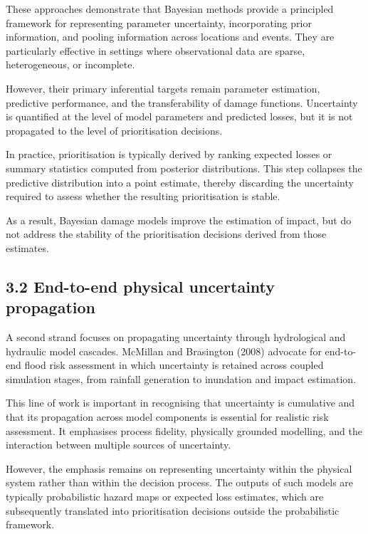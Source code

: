\documentclass[
]{article}
\begin{document}
These approaches demonstrate that Bayesian methods provide a principled
framework for representing parameter uncertainty, incorporating prior
information, and pooling information across locations and events. They
are particularly effective in settings where observational data are
sparse, heterogeneous, or incomplete.

However, their primary inferential targets remain parameter estimation,
predictive performance, and the transferability of damage functions.
Uncertainty is quantified at the level of model parameters and predicted
losses, but it is not propagated to the level of prioritisation
decisions.

In practice, prioritisation is typically derived by ranking expected
losses or summary statistics computed from posterior distributions. This
step collapses the predictive distribution into a point estimate,
thereby discarding the uncertainty required to assess whether the
resulting prioritisation is stable.

As a result, Bayesian damage models improve the estimation of impact,
but do not address the stability of the prioritisation decisions derived
from those estimates.

\subsection{3.2 End-to-end physical uncertainty
propagation}\label{end-to-end-physical-uncertainty-propagation}

A second strand focuses on propagating uncertainty through hydrological
and hydraulic model cascades. McMillan and Brasington (2008) advocate
for end-to-end flood risk assessment in which uncertainty is retained
across coupled simulation stages, from rainfall generation to inundation
and impact estimation.

This line of work is important in recognising that uncertainty is
cumulative and that its propagation across model components is essential
for realistic risk assessment. It emphasises process fidelity,
physically grounded modelling, and the interaction between multiple
sources of uncertainty.

However, the emphasis remains on representing uncertainty within the
physical system rather than within the decision process. The outputs of
such models are typically probabilistic hazard maps or expected loss
estimates, which are subsequently translated into prioritisation
decisions outside the probabilistic framework.
\end{document}
